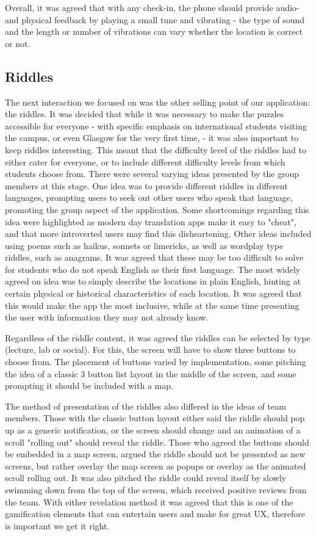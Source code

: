 \documentclass[10pt,twocolumn]{article} %
\begin{document}
Overall, it was agreed that with any check-in, the phone should provide audio- and physical feedback by playing a small tune and vibrating - the type of sound and the length or number of vibrations can vary whether the location is correct or not.
\subsection*{Riddles}
The next interaction we focused on was the other selling point of our application: the riddles. 
It was decided that while it was necessary to make the puzzles accessible for everyone - with specific emphasis on international students visiting the campus, or even Glasgow for the very first time, - it was also important to keep riddles interesting.
This meant that the difficulty level of the riddles had to either cater for everyone, or to include different difficulty levels from which students choose from.
There were several varying ideas presented by the group members at this stage.
One idea was to provide different riddles in different languages, prompting users to seek out other users who speak that language, promoting the group aspect of the application. Some shortcomings regarding this idea were highlighted as modern day translation apps make it easy to "cheat", and that more introverted users may find this disheartening.
Other ideas included using poems such as haikus, sonnets or limericks, as well as wordplay type riddles, such as anagrams. It was agreed that these may be too difficult to solve for students who do not speak English as their first language.
The most widely agreed on idea was to simply describe the locations in plain English, hinting at certain physical or historical characteristics of each location. It was agreed that this would make the app the most inclusive, while at the same time presenting the user with information they may not already know.

Regardless of the riddle content, it was agreed the riddles can be selected by type (lecture, lab or social). For this, the screen will have to show three buttons to choose from. 
The placement of buttons varied by implementation, some pitching the idea of a classic 3 button list layout in the middle of the screen, and some prompting it should be included with a map.

The method of presentation of the riddles also differed in the ideas of team members. 
Those with the classic button layout either said the riddle should pop up as a generic notification, or the screen should change and an animation of a scroll "rolling out" should reveal the riddle.
Those who agreed the buttons should be embedded in a map screen, argued the riddle should not be presented as new screens, but rather overlay the map screen as popups or overlay as the animated scroll rolling out.
It was also pitched the riddle could reveal itself by slowly swimming down from the top of the screen, which received positive reviews from the team.
With either revelation method it was agreed that this is one of the gamification elements that can entertain users and make for great UX, therefore is important we get it right.
\end{document}
